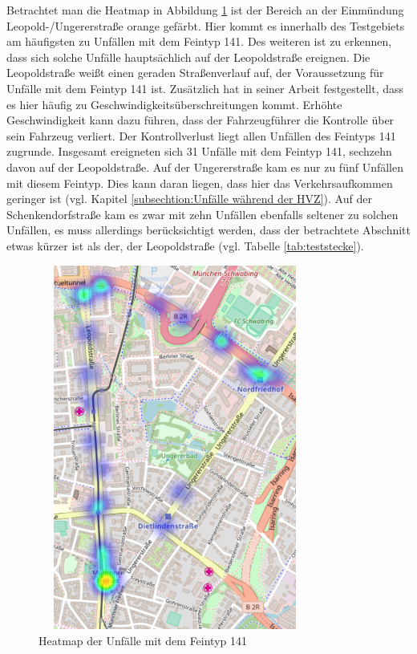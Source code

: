 Betrachtet man die Heatmap in Abbildung \ref{fig:Heatmap_141} ist der Bereich an der Einmündung Leopold-/Ungererstraße orange gefärbt. Hier kommt es innerhalb des Testgebiets am häufigsten zu Unfällen mit dem Feintyp 141. Des weiteren ist zu erkennen, dass sich solche Unfälle hauptsächlich auf der Leopoldstraße ereignen. Die Leopoldstraße weißt einen geraden Straßenverlauf auf, der Voraussetzung für Unfälle mit dem Feintyp 141 ist. Zusätzlich hat \Textcite[S. 20]{Bruhn.2018} in seiner Arbeit festgestellt, dass es hier häufig zu Geschwindigkeitsüberschreitungen kommt. Erhöhte Geschwindigkeit kann dazu führen, dass der Fahrzeugführer die Kontrolle über sein Fahrzeug verliert. Der Kontrollverlust liegt allen Unfällen des Feintyps 141 zugrunde. Insgesamt ereigneten sich 31 Unfälle mit dem Feintyp 141, sechzehn davon auf der Leopoldstraße. Auf der Ungererstraße kam es nur zu fünf Unfällen mit diesem Feintyp. Dies kann daran liegen, dass hier das Verkehrsaufkommen geringer ist (vgl. Kapitel \ref{subsechtion:Unfälle während der HVZ}). Auf der Schenkendorfstraße kam es zwar mit zehn Unfällen ebenfalls seltener zu solchen Unfällen, es muss allerdings berücksichtigt werden, dass der betrachtete Abschnitt etwas kürzer ist als der, der Leopoldstraße (vgl. Tabelle \ref{tab:teststecke}).

\begin{savenotes}
	\begin{figure}[H]
		\centering
		\includegraphics[width=9cm,height=12cm]{figures/HM_141}
		\caption[Heatmap der Unfälle mit dem Feintyp 141]{Heatmap der Unfälle mit dem Feintyp 141}\label{fig:Heatmap_141}
	\end{figure}
\end{savenotes}

